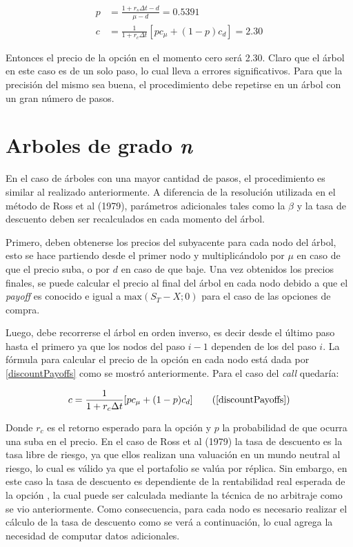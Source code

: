 \begin{align}
	p &= \frac{1 + r_s \Delta t - d}{\mu - d} = 0.5391\\
	c &= \frac{1}{1+r_c \Delta t} \left[ p c_\mu + (1-p) c_d \right] = 2.30
\end{align}


Entonces el precio de la opción en el momento cero será 2.30. Claro que el árbol en este caso es de un solo paso, lo cual lleva a errores significativos. Para que la precisión del mismo sea buena, el procedimiento debe repetirse en un árbol con un gran número de pasos.

\section{Arboles de grado \textit{n}}

En el caso de árboles con una mayor cantidad de pasos, el procedimiento es similar al realizado anteriormente. A diferencia de la resolución utilizada en el método de Ross et al (1979)\nocite{rosscoxrubinstein}, parámetros adicionales tales como la $\beta$ y la tasa de descuento deben ser recalculados en cada momento del árbol.

Primero, deben obtenerse los precios del subyacente para cada nodo del árbol, esto se hace partiendo desde el primer nodo y multiplicándolo por $\mu$ en caso de que el precio suba, o por $d$ en caso de que baje. Una vez obtenidos los precios finales, se puede calcular el precio al final del árbol en cada nodo debido a que el \textit{payoff} es conocido e igual a $\mbox{max}(S_T - X;0)$ para el caso de las opciones de compra.

Luego, debe recorrerse el árbol en orden inverso, es decir desde el último paso hasta el primero ya que los nodos del paso $i-1$ dependen de los del paso $i$. La fórmula para calcular el precio de la opción en cada nodo está dada por \eqref{discountPayoffs} como se mostró anteriormente. Para el caso del \textit{call} quedaría:

\begin{equation}
	c = \frac{1}{1 + r_c \Delta t} [p c_\mu + (1-p) c_d] \tag{\ref{discountPayoffs}}
\end{equation}

Donde $r_c$ es el retorno esperado para la opción y $p$ la probabilidad de que ocurra una suba en el precio. En el caso de Ross et al (1979)\nocite{rosscoxrubinstein} la tasa de descuento es la tasa libre de riesgo, ya que ellos realizan una valuación en un mundo neutral al riesgo, lo cual es válido ya que el portafolio se valúa por réplica. Sin embargo, en este caso la tasa de descuento es dependiente de la rentabilidad real esperada de la opción \cite{optionsmarkets}, la cual puede ser calculada mediante la técnica de no arbitraje como se vio anteriormente. Como consecuencia, para cada nodo es necesario realizar el cálculo de la tasa de descuento como se verá a continuación, lo cual agrega la necesidad de computar datos adicionales.

